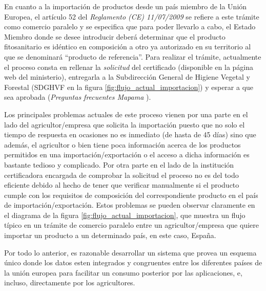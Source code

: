 \par
En cuanto a la importación de productos desde un país miembro de la Unión Europea, el artículo 52 del \textit{Reglamento (CE) 11/07/2009} \cite{reglamento} se refiere a este trámite como comercio paralelo y se especifica que para poder llevarlo a cabo, el Estado Miembro donde se desee introducir deberá determinar que el producto fitosanitario es idéntico en composición a otro ya autorizado en su territorio al que se denominará “producto de referencia”. Para realizar el trámite, actualmente el proceso consta en rellenar la \textit{solicitud} del \gls{certificado} \cite{solicitud} (disponible en la página web del ministerio), entregarla a la Subdirección General de Higiene Vegetal y Forestal (SDGHVF en la figura \ref{fig:flujo_actual_importacion}) y esperar a que sea aprobada (\textit{Preguntas frecuentes Mapama} \cite{faqmapama}). 

\par
Los principales problemas actuales de este proceso vienen por una parte en el lado del agricultor/empresa que solicita la importación puesto que no solo el tiempo de respuesta en ocasiones no es inmediato (de hasta de 45 días) sino que además, el agricultor o bien tiene poca información acerca de los productos permitidos en una importación/exportación o el acceso a dicha información es bastante tedioso y complicado. Por otra parte en el lado de la institución certificadora encargada de comprobar la solicitud el proceso no es del todo eficiente debido al hecho de tener que verificar manualmente si el producto cumple con los requisitos de composición del correspondiente producto en el país de importación/exportación. Estos problemas se pueden observar claramente en el diagrama de la figura \ref{fig:flujo_actual_importacion}, que muestra un flujo típico en un trámite de comercio paralelo entre un agricultor/empresa que quiere importar un producto a un determinado país, en este caso, España. 

\par
Por todo lo anterior, es razonable desarrollar un sistema que provea un esquema único donde los datos esten integrados y congruentes entre los diferentes países de la unión europea para facilitar un consumo posterior por las aplicaciones, e, incluso, directamente por los agricultores. 

